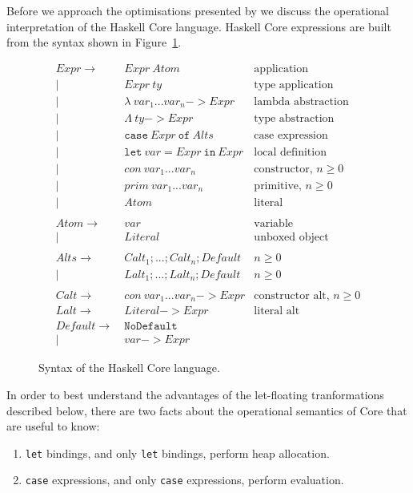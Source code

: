 Before we approach the optimisations presented by \citet{jones1996} we discuss the operational interpretation of the Haskell Core language. Haskell Core expressions are built from the syntax shown in Figure~\ref{fig:haskell_core}.

\begin{figure}[h]
\begin{align*}
Expr \to~& Expr~Atom & \text{application}\\
|~& Expr~ty & \text{type application}\\
|~& \lambda~var_1 ... var_n \mathtt{->} Expr & \text{lambda abstraction}\\
|~& \Lambda~ty \mathtt{->} Expr & \text{type abstraction}\\
|~& \mathtt{case}~Expr~\mathtt{of}~Alts & \text{case expression}\\
|~& \mathtt{let}~var\mathtt{=}Expr~\mathtt{in}~Expr & \text{local definition}\\
|~& con~var_1 ... var_n & \text{constructor, $n \geq 0$}\\
|~& prim~var_1 ... var_n & \text{primitive, $n \geq 0$}\\
|~& Atom & \text{literal}\\
\\
Atom \to~& var & \text{variable}\\
|~& Literal & \text{unboxed object}\\
\\
Alts \to~& Calt_1; ...; Calt_n; Default & \text{$n \geq 0$}\\
|~& Lalt_1; ...; Lalt_n; Default & \text{$n \geq 0$}\\
\\
Calt \to~& con~var_1 ... var_n \mathtt{->} Expr & \text{constructor alt, $n \geq 0$}\\
Lalt \to~& Literal \mathtt{->} Expr & \text{literal alt}\\
Default \to~& \mathtt{NoDefault} & \text{}\\
|~& var \mathtt{->} Expr & \text{}
\end{align*}
\caption{Syntax of the Haskell Core language.}
\label{fig:haskell_core}
\end{figure}

In order to best understand the advantages of the let-floating tranformations described below, there are two facts about the operational semantics of Core that are useful to know:
\begin{enumerate}
\item \lstinline{let} bindings, and only \lstinline{let} bindings, perform heap allocation.
\item \lstinline{case} expressions, and only \lstinline{case} expressions, perform evaluation.
\end{enumerate}

